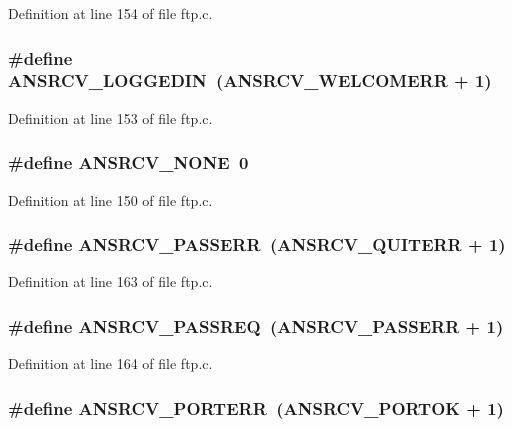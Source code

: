 Definition at line 154 of file ftp.c.

\hypertarget{group__ftp_ga789dffa9cb46046e7ad4a58fa6b56938}{
\subsubsection[{ANSRCV\_\-LOGGEDIN}]{\setlength{\rightskip}{0pt plus 5cm}\#define ANSRCV\_\-LOGGEDIN~(ANSRCV\_\-WELCOMERR + 1)}}
\label{group__ftp_ga789dffa9cb46046e7ad4a58fa6b56938}


Definition at line 153 of file ftp.c.

\hypertarget{group__ftp_ga20c7bbe8c9836e383a612d6d5b8be490}{
\subsubsection[{ANSRCV\_\-NONE}]{\setlength{\rightskip}{0pt plus 5cm}\#define ANSRCV\_\-NONE~0}}
\label{group__ftp_ga20c7bbe8c9836e383a612d6d5b8be490}


Definition at line 150 of file ftp.c.

\hypertarget{group__ftp_ga0283e7472be62c40d4c08580ac6de3c0}{
\subsubsection[{ANSRCV\_\-PASSERR}]{\setlength{\rightskip}{0pt plus 5cm}\#define ANSRCV\_\-PASSERR~(ANSRCV\_\-QUITERR + 1)}}
\label{group__ftp_ga0283e7472be62c40d4c08580ac6de3c0}


Definition at line 163 of file ftp.c.

\hypertarget{group__ftp_ga6615198a241d31598ce0f3b1d66d3d2c}{
\subsubsection[{ANSRCV\_\-PASSREQ}]{\setlength{\rightskip}{0pt plus 5cm}\#define ANSRCV\_\-PASSREQ~(ANSRCV\_\-PASSERR + 1)}}
\label{group__ftp_ga6615198a241d31598ce0f3b1d66d3d2c}


Definition at line 164 of file ftp.c.

\hypertarget{group__ftp_gacef9c9ff9562f789bd2c2064614a87ac}{
\subsubsection[{ANSRCV\_\-PORTERR}]{\setlength{\rightskip}{0pt plus 5cm}\#define ANSRCV\_\-PORTERR~(ANSRCV\_\-PORTOK + 1)}}
\label{group__ftp_gacef9c9ff9562f789bd2c2064614a87ac}


